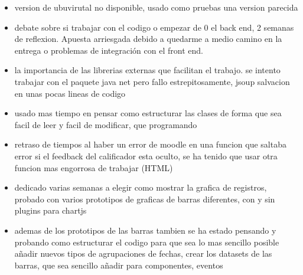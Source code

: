 \begin{itemize}
	\item version de ubuvirutal no disponible, usado como pruebas una version parecida
	\item debate sobre si trabajar con el codigo o empezar de 0 el back end, 2 semanas de reflexion. Apuesta arriesgada debido a quedarme a medio camino en la entrega o problemas de integración con el front end.
	\item la importancia de las librerias externas que facilitan el trabajo. se intento trabajar con el paquete java net pero fallo estrepitosamente, jsoup salvacion en unas pocas lineas de codigo
	\item usado mas tiempo en pensar como estructurar las clases de forma que sea facil de leer y facil de modificar, que programando
	\item retraso de tiempos al haber un error de moodle en una funcion que saltaba error si el feedback del calificador esta oculto, se ha tenido que usar otra funcion mas engorrosa de trabajar (HTML)
	\item dedicado varias semanas a elegir como mostrar la grafica de registros, probado con varios prototipos de graficas de barras diferentes, con y sin plugins para chartjs
	\item ademas de los prototipos de las barras tambien se ha estado pensando y probando como estructurar el codigo para que sea lo mas sencillo posible añadir nuevos tipos de agrupaciones de fechas, crear los datasets de las barras, que sea sencillo añadir para componentes, eventos
\end{itemize}

